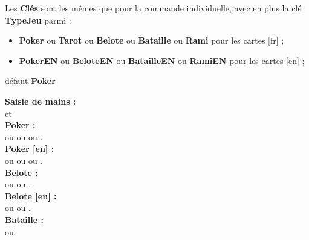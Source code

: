 \documentclass[a4paper]{article}
\newcommand\cmaj[1]{\tcbox[vignetteMaJ]{#1}\xspace}
\newcommand\Cle[1]{{\bfseries\sffamily\textlangle #1\textrangle}}
\begin{document}
\begin{codecles}
Les \Cle{Clés} sont les mêmes que pour la commande individuelle, avec en plus la clé \Cle{TypeJeu} parmi :
\begin{itemize}[leftmargin=*,label={\tiny\faTools}]
  \item \Cle{Poker} ou \Cle{Tarot} ou \Cle{Belote} ou \Cle{Bataille} ou \Cle{Rami} pour les cartes [fr] ;
  \item \cmaj{0.2.5} \Cle{PokerEN} ou \Cle{BeloteEN} ou \Cle{BatailleEN} ou \Cle{RamiEN} pour les cartes [en] ;
\end{itemize}
\hfill{}défaut \Cle{Poker}
\end{codecles}

\begin{codetex}[]
\textbf{\large Saisie de mains : }\\
 et~
\\

\textbf{\large Poker : }\\
 ou  ou  ou .\\

\textbf{\large Poker [en] : }\\
 ou  ou  ou .\\

\textbf{\large Belote :}\\
 ou  ou .\\

\textbf{\large Belote [en] :}\\
 ou  ou .\\

\textbf{\large Bataille : }\\
 ou .\\


\end{codetex}
\end{document}
